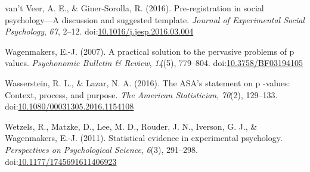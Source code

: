 \documentclass[english,mask,man]{apa6}
\theoremstyle{definition}
\theoremstyle{definition}
\theoremstyle{definition}
\theoremstyle{remark}
\begin{document}
\hypertarget{ref-VantVeer2016}{}
van't Veer, A. E., \& Giner-Sorolla, R. (2016). Pre-registration in
social psychology---A discussion and suggested template. \emph{Journal
of Experimental Social Psychology}, \emph{67}, 2--12.
doi:\href{https://doi.org/10.1016/j.jesp.2016.03.004}{10.1016/j.jesp.2016.03.004}

\hypertarget{ref-Wagenmakers2007}{}
Wagenmakers, E.-J. (2007). A practical solution to the pervasive
problems of p values. \emph{Psychonomic Bulletin \& Review},
\emph{14}(5), 779--804.
doi:\href{https://doi.org/10.3758/BF03194105}{10.3758/BF03194105}

\hypertarget{ref-Wasserstein2016}{}
Wasserstein, R. L., \& Lazar, N. A. (2016). The ASA's statement on p
-values: Context, process, and purpose. \emph{The American
Statistician}, \emph{70}(2), 129--133.
doi:\href{https://doi.org/10.1080/00031305.2016.1154108}{10.1080/00031305.2016.1154108}

\hypertarget{ref-Wetzels2011}{}
Wetzels, R., Matzke, D., Lee, M. D., Rouder, J. N., Iverson, G. J., \&
Wagenmakers, E.-J. (2011). Statistical evidence in experimental
psychology. \emph{Perspectives on Psychological Science}, \emph{6}(3),
291--298.
doi:\href{https://doi.org/10.1177/1745691611406923}{10.1177/1745691611406923}
\end{document}
